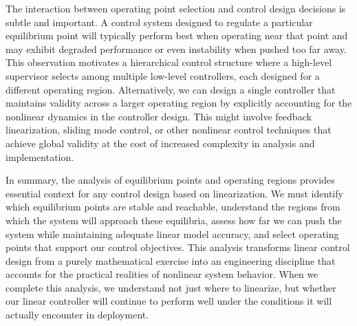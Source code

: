 The interaction between operating point selection and control design decisions is subtle and important. A control system designed to regulate a particular equilibrium point will typically perform best when operating near that point and may exhibit degraded performance or even instability when pushed too far away. This observation motivates a hierarchical control structure where a high-level supervisor selects among multiple low-level controllers, each designed for a different operating region. Alternatively, we can design a single controller that maintains validity across a larger operating region by explicitly accounting for the nonlinear dynamics in the controller design. This might involve feedback linearization, sliding mode control, or other nonlinear control techniques that achieve global validity at the cost of increased complexity in analysis and implementation.

In summary, the analysis of equilibrium points and operating regions provides essential context for any control design based on linearization. We must identify which equilibrium points are stable and reachable, understand the regions from which the system will approach these equilibria, assess how far we can push the system while maintaining adequate linear model accuracy, and select operating points that support our control objectives. This analysis transforms linear control design from a purely mathematical exercise into an engineering discipline that accounts for the practical realities of nonlinear system behavior. When we complete this analysis, we understand not just where to linearize, but whether our linear controller will continue to perform well under the conditions it will actually encounter in deployment.
